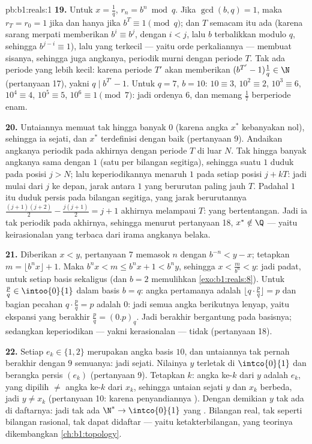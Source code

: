 \begin{solution}{pb:b1:reals:1}
\textbf{19.} Untuk $x = \frac 1q$, $r_n = b^n \bmod q$. Jika
$\gcd(b, q) = 1$, maka $r_T = r_0 = 1$ jika dan hanya jika $b^T \equiv
1 \pmod q$; dan $T$ semacam itu ada (karena sarang merpati memberikan $b^i \equiv b^j$,
dengan $i < j$, lalu $b$ terbalikkan modulo $q$, sehingga $b^{j-i} \equiv
1$), lalu yang terkecil --- yaitu orde perkaliannya --- membuat
sisanya, sehingga juga angkanya, periodik murni dengan periode $T$.
Tak ada periode yang lebih kecil: karena periode $T'$ akan memberikan $(b^{T'}
- 1)\frac1q \in \N$ (pertanyaan 17), yakni $q \mid b^{T'} - 1$.
Untuk $q = 7$, $b = 10$: $10 \equiv 3$, $10^2 \equiv 2$, $10^3
\equiv 6$, $10^4 \equiv 4$, $10^5 \equiv 5$, $10^6 \equiv 1
\pmod 7$: jadi ordenya $6$, dan memang $\frac 17$ berperiode enam.

\textbf{20.} Untaiannya memuat tak hingga banyak $0$ (karena angka $x^*$
kebanyakan nol), sehingga ia sejati, dan $x^*$ terdefinisi dengan baik
(pertanyaan 9). Andaikan angkanya periodik pada akhirnya dengan periode
$T$ di luar $N$. Tak hingga banyak angkanya sama dengan $1$ (satu per
bilangan segitiga), sehingga suatu $1$ duduk pada posisi $j > N$; lalu
keperiodikannya menaruh $1$ pada setiap posisi $j + kT$: jadi mulai dari $j$
ke depan, jarak antara $1$ yang berurutan paling jauh $T$. Padahal
$1$ itu duduk persis pada bilangan segitiga, yang jarak berurutannya
$\frac{(j+1)(j+2)}{2} - \frac{j(j+1)}{2} = j + 1$ akhirnya melampaui $T$:
yang bertentangan. Jadi ia tak periodik pada akhirnya, sehingga menurut
pertanyaan 18, $x^* \notin \Q$ --- yaitu keirasionalan yang terbaca dari
irama angkanya belaka.

\textbf{21.} Diberikan $x < y$, pertanyaan 7 memasok $n$ dengan $b^{-n}
< y - x$; tetapkan $m = \lfloor b^n x \rfloor + 1$. Maka $b^n x < m
\leq b^n x + 1 < b^n y$, sehingga $x < \frac{m}{b^n} < y$: jadi padat,
untuk setiap basis sekaligus (dan $b = 2$ memulihkan
\cref{exo:b1:reals:8}). Untuk $\frac pq \in \intoo{0}{1}$ dalam basis
$b = q$: angka pertamanya adalah $\lfloor q \cdot \frac pq \rfloor =
p$ dan bagian pecahan $q \cdot \frac pq = p$ adalah $0$: jadi semua
angka berikutnya lenyap, yaitu ekspansi yang berakhir $\frac pq =
(0.p)_q$. Jadi berakhir bergantung pada basisnya; sedangkan keperiodikan ---
yakni kerasionalan --- tidak (pertanyaan 18).

\textbf{22.} Setiap $e_k \in \{1, 2\}$ merupakan angka basis $10$, dan
untaiannya tak pernah berakhir dengan $9$ semuanya: jadi sejati. Nilainya $y$ terletak di
$\intco{0}{1}$ dan berangka persis $(e_k)$ (pertanyaan 9). Tetapkan
$k$: angka ke-$k$ dari $y$ adalah $e_k$, yang dipilih $\neq$ angka ke-$k$
dari $x_k$, sehingga untaian sejati $y$ dan $x_k$ berbeda, jadi
$y \neq x_k$ (pertanyaan 10: karena penyandiannya ). Dengan demikian $y$
tak ada di daftarnya: jadi tak ada  $\N^* \to \intco{0}{1}$ yang .
Bilangan real, tak seperti bilangan rasional, tak dapat didaftar ---
yaitu ketakterbilangan, yang teorinya dikembangkan \cref{ch:b1:topology}.


\end{solution}
